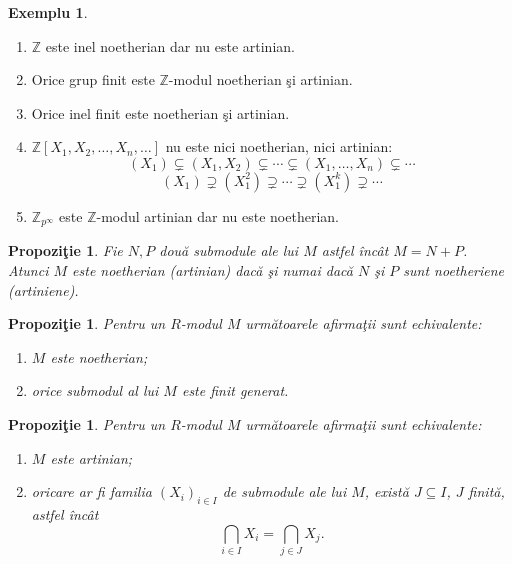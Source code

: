 \documentclass[12pt,a4paper]{book}
\theoremstyle{plain}
\newtheorem{proposition}[theorem]{Propoziţie}
\theoremstyle{definition}
\newtheorem{example}[theorem]{Exemplu}
\theoremstyle{remark}
\begin{document}
\begin{example}
\leavevmode
\begin{enumerate}
  \item \(\mathbb{Z}\) este inel noetherian dar nu este artinian.
  \item Orice grup finit este \(\mathbb{Z}\)-modul noetherian şi artinian.
  \item Orice inel finit este noetherian şi artinian.
  \item \(\mathbb{Z}[X_1,X_2,\ldots,X_n,\ldots]\) nu este nici noetherian,
        nici artinian:
        \[
          (X_1) \subsetneq (X_1,X_2) \subsetneq \cdots \subsetneq
          (X_1,\ldots,X_n) \subsetneq \cdots
        \]
        \[
          (X_1) \supsetneq (X_1^2) \supsetneq \cdots \supsetneq
          (X_1^k) \supsetneq \cdots
        \]
  \item \(\mathbb{Z}_{p^\infty}\) este \(\mathbb{Z}\)-modul artinian dar nu
        este noetherian.
\end{enumerate}
\end{example}

\begin{proposition}
Fie \(N, P\) două submodule ale lui \(M\) astfel încât \(M = N + P\).
Atunci \(M\) este noetherian (artinian) dacă şi numai dacă \(N\) şi \(P\) sunt
noetheriene (artiniene).
\end{proposition}

\begin{proposition}
Pentru un \(R\)-modul \(M\) următoarele afirmaţii sunt echivalente:
\begin{enumerate}
  \item \(M\) este noetherian;
  \item orice submodul al lui \(M\) este finit generat.
\end{enumerate}
\end{proposition}

\begin{proposition}
Pentru un \(R\)-modul \(M\) următoarele afirmaţii sunt echivalente:
\begin{enumerate}
  \item \(M\) este artinian;
  \item oricare ar fi familia \((X_i)_{i\in I}\) de submodule ale lui \(M\),
        există \(J \subseteq I\), \(J\) finită, astfel încât
        \[
          \bigcap_{i\in I} X_i = \bigcap_{j\in J} X_j.
        \]
\end{enumerate}
\end{proposition}
\end{document}
